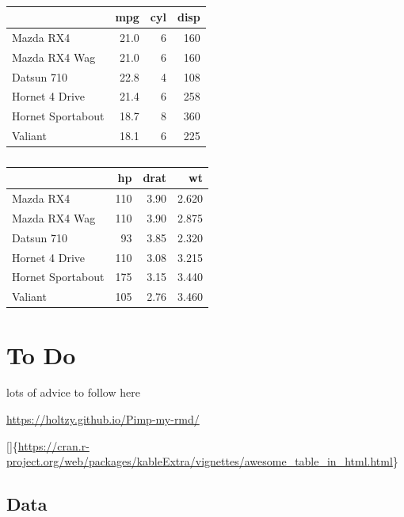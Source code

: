 \documentclass[
]{article}
\begin{document}
\begin{table}[!htb]
    \begin{minipage}{.5\linewidth}
      \caption{}
      \centering 
\begin{tabular}{lrrr}
\toprule
  & mpg & cyl & disp\\
\midrule
Mazda RX4 & 21.0 & 6 & 160\\
Mazda RX4 Wag & 21.0 & 6 & 160\\
Datsun 710 & 22.8 & 4 & 108\\
Hornet 4 Drive & 21.4 & 6 & 258\\
Hornet Sportabout & 18.7 & 8 & 360\\
\addlinespace
Valiant & 18.1 & 6 & 225\\
\bottomrule
\end{tabular} \end{minipage}%
    \begin{minipage}{.5\linewidth}
      \centering
        \caption{} 
\begin{tabular}{lrrr}
\toprule
  & hp & drat & wt\\
\midrule
Mazda RX4 & 110 & 3.90 & 2.620\\
Mazda RX4 Wag & 110 & 3.90 & 2.875\\
Datsun 710 & 93 & 3.85 & 2.320\\
Hornet 4 Drive & 110 & 3.08 & 3.215\\
Hornet Sportabout & 175 & 3.15 & 3.440\\
\addlinespace
Valiant & 105 & 2.76 & 3.460\\
\bottomrule
\end{tabular} \end{minipage} 
\end{table}

\hypertarget{to-do}{%
\section{To Do}\label{to-do}}

lots of advice to follow here

\url{https://holtzy.github.io/Pimp-my-rmd/}

{[}{]}\{\url{https://cran.r-project.org/web/packages/kableExtra/vignettes/awesome_table_in_html.html}\}

\hypertarget{data}{%
\subsection{Data}\label{data}}
\end{document}
